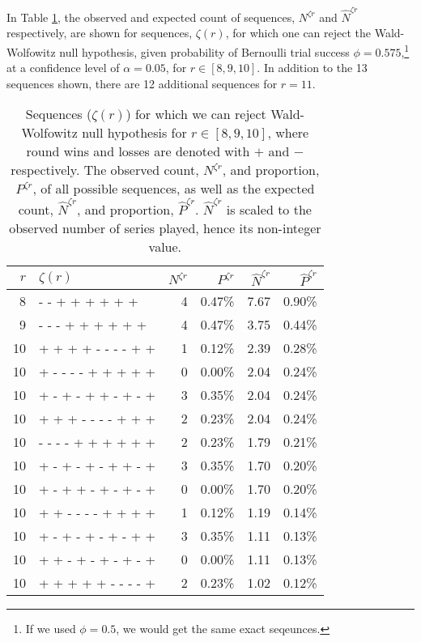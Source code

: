 \documentclass{article}
\begin{document}
In Table \ref{tbl:ww-sequences}, the observed and expected count of
sequences, \(N^{\zeta r}\) and \(\hat{N}^{\zeta r}\) respectively, are
shown for sequences, \(\zeta(r)\), for which one can reject the
Wald-Wolfowitz null hypothesis, given probability of Bernoulli trial
success \(\phi = 0.575\),\footnote{If we used \(\phi = 0.5\), we would
  get the same exact seqeunces.} at a confidence level of
\(\alpha = 0.05\), for \(r \in [8, 9, 10]\). In addition to the 13
sequences shown, there are 12 additional sequences for \(r = 11\).

\begin{table}

\caption{Sequences ($\zeta(r)$) for which we can reject Wald-Wolfowitz null hypothesis for $r \in [8, 9, 10]$, where round wins and losses are denoted with $+$ and $-$ respectively. The observed count, $N^{\zeta r}$, and proportion, $P^{\zeta r}$, of all possible sequences, as well as the expected count, $\hat{N}^{\zeta r}$, and proportion, $\hat{P}^{\zeta r}$. $\hat{N}^{\zeta r}$ is scaled to the observed number of series played, hence its non-integer value.}

\centering
\begin{tabular}{rlrrrr}
\toprule
$r$ & $\zeta(r)$ & $N^{\zeta r}$ & $P^{\zeta r}$ & $\hat{N}^{\zeta r}$ & $\hat{P}^{\zeta r}$ \\ 
\midrule
8 & - - + + + + + + & 4 & 0.47\% & 7.67 & 0.90\% \\ 
9 & - - - + + + + + + & 4 & 0.47\% & 3.75 & 0.44\% \\ 
10 & + + + + - - - - + + & 1 & 0.12\% & 2.39 & 0.28\% \\ 
10 & + - - - - + + + + + & 0 & 0.00\% & 2.04 & 0.24\% \\ 
10 & + - + - + + - + - + & 3 & 0.35\% & 2.04 & 0.24\% \\ 
10 & + + + - - - - + + + & 2 & 0.23\% & 2.04 & 0.24\% \\ 
10 & - - - - + + + + + + & 2 & 0.23\% & 1.79 & 0.21\% \\ 
10 & + - + - + - + + - + & 3 & 0.35\% & 1.70 & 0.20\% \\ 
10 & + - + + - + - + - + & 0 & 0.00\% & 1.70 & 0.20\% \\ 
10 & + + - - - - + + + + & 1 & 0.12\% & 1.19 & 0.14\% \\ 
10 & + - + - + - + - + + & 3 & 0.35\% & 1.11 & 0.13\% \\ 
10 & + + - + - + - + - + & 0 & 0.00\% & 1.11 & 0.13\% \\ 
10 & + + + + + - - - - + & 2 & 0.23\% & 1.02 & 0.12\% \\ 

\bottomrule
\end{tabular}

\label{tbl:ww-sequences}
\end{table}
\end{document}
